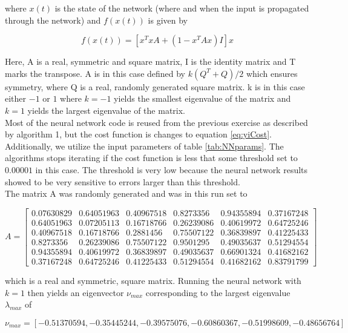 \documentclass[12pt,a4paper]{article}
\begin{document}
\noindent where $x(t)$ is the state of the network (where and when the input is propagated through the network) and $f(x(t))$ is given by 

\begin{equation}\label{eq:fxt}
f(x(t)) = [x^TxA + (1-x^TAx)I]x
\end{equation}

\noindent Here, A is a real, symmetric and square matrix, I is the identity matrix and T marks the transpose. A is in this case defined by $k(Q^T + Q)/2$ which ensures symmetry, where Q is a real, randomly generated square matrix. k is in this case either $-1$ or $1$ where $k = -1$ yields the smallest eigenvalue of the matrix and $k = 1$ yields the largest eigenvalue of the matrix. 
\\
Most of the neural network code is reused from the previous exercise as described by algorithm 1, but the cost function is changes to equation \ref{eq:yiCost}. Additionally, we utilize the input parameters of table \ref{tab:NNparams}. The algorithms stops iterating if the cost function is less that some threshold set to $0.00001$ in this case. The threshold is very low because the neural network results showed to be very sensitive to errors larger than this threshold.
\\
The matrix A was randomly generated and was in this run set to

\[
A=
  \begin{bmatrix}
    0.07630829 & 0.64051963 & 0.40967518 & 0.8273356 & 0.94355894 & 0.37167248 \\
    0.64051963 & 0.07205113 & 0.16718766 & 0.26239086 & 0.40619972 & 0.64725246 \\
    0.40967518 & 0.16718766 & 0.2881456 & 0.75507122 & 0.36839897 & 0.41225433 \\
    0.8273356 & 0.26239086 & 0.75507122 & 0.9501295 & 0.49035637 & 0.51294554 \\
    0.94355894 & 0.40619972 & 0.36839897 & 0.49035637 & 0.66901324 & 0.41682162 \\
    0.37167248 & 0.64725246 & 0.41225433 & 0.51294554 & 0.41682162 & 0.83791799 
  \end{bmatrix}
\]

\noindent which is a real and symmetric, square matrix. Running the neural network with $k = 1$ then yields an eigenvector $\nu_{max}$ corresponding to the largest eigenvalue $\lambda_{max}$ of 

\begin{equation}\label{eq:minEigenVec}
\nu_{max}=[-0.51370594, -0.35445244, -0.39575076, -0.60860367, -0.51998609, -0.48656764]
\end{equation}
\end{document}
